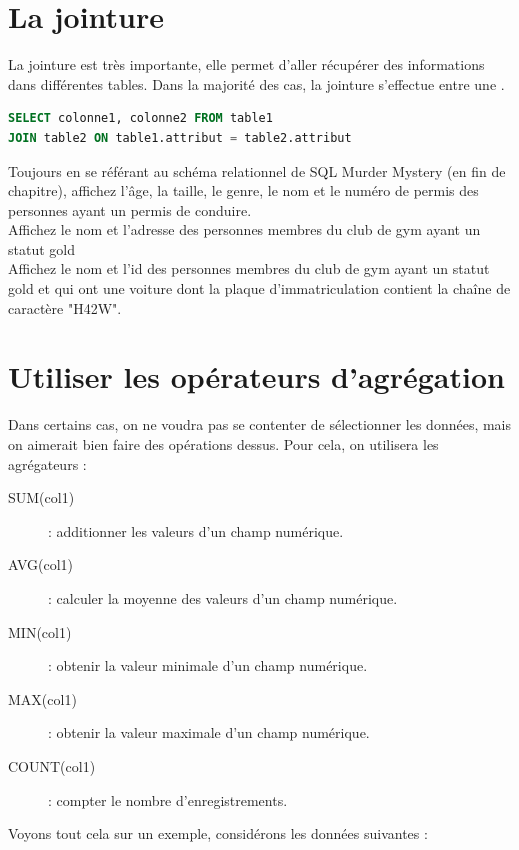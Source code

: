 \section{La jointure}
La jointure est très importante, elle permet d'aller récupérer des informations dans différentes tables.
Dans la majorité des cas, la jointure s'effectue entre une .

\begin{lstlisting}[style=SQLstyle, language=SQL]
SELECT colonne1, colonne2 FROM table1
JOIN table2 ON table1.attribut = table2.attribut
\end{lstlisting}

\begin{Exercise}
\Question Toujours en se référant au schéma relationnel de SQL Murder Mystery (en fin de chapitre), affichez l'âge, la taille, le genre, le nom et le numéro de permis des personnes ayant un  permis de conduire.\\
\emptybox{3cm}
\Question Affichez le nom et l'adresse des personnes membres du club de gym ayant un statut gold\\
\emptybox{3cm}
\newpage
\Question Affichez le nom et l'id des personnes membres du club de gym ayant un statut gold et qui ont une voiture dont la plaque d'immatriculation contient la chaîne de caractère "H42W".\\
\emptybox{3cm}
\end{Exercise}
\section{Utiliser les opérateurs d'agrégation}
Dans certains cas, on ne voudra pas se contenter de sélectionner les données, mais on aimerait bien faire des opérations dessus. Pour cela, on utilisera les agrégateurs :
\begin{description}
    \item[SUM(col1)]: additionner les valeurs d'un champ numérique.
    \item[AVG(col1)]: calculer la moyenne des valeurs d'un champ numérique.
    \item[MIN(col1)]: obtenir la valeur minimale d'un champ numérique.
    \item[MAX(col1)]: obtenir la valeur maximale d'un champ numérique.
    \item[COUNT(col1)]: compter le nombre d'enregistrements.
\end{description}
Voyons tout cela sur un exemple, considérons les données suivantes :

